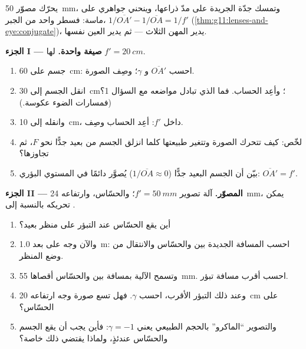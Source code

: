 \begin{problem}
\label{pb:g11:lenses-and-eye:1}
يحرّك مصوّر  \qty{50}{mm}، وتمسك جدّة الجريدة
على مدّ ذراعها، وينحني جواهري على ماسة: فسطر واحد من
الجبر، $1/\overline{OA'} - 1/\overline{OA} = 1/f'$
(\cref{thm:g11:lenses-and-eye:conjugate})، يدير المهن الثلاث ---
ثم يدير العين نفسها.

\medskip
\noindent\textbf{الجزء I --- صيغة واحدة.}  لها
$f' = \qty{20}{cm}$.
\begin{enumerate}
  \item جسم على \qty{60}{cm}: احسب $\overline{OA'}$ و
        $\gamma$؛ وصِف الصورة.
  \item انقل الجسم إلى \qty{30}{cm}؛ وأعِد الحساب. فما الذي تبادل مواضعه
        مع السؤال 1؟ (فمسارات الضوء عكوسة.)
  \item وانقله إلى \qty{10}{cm}، داخل $f'$: أعِد الحساب وصِف.
  \item لخّص: كيف تتحرك الصورة وتتغير طبيعتها كلما انزلق الجسم من
        بعيد جدًّا نحو $F$، ثم تجاوزها؟
  \item بيّن أن الجسم البعيد جدًّا ($1/\overline{OA} \approx 0$)
        يُصوَّر دائمًا في المستوي البؤري: $\overline{OA'} = f'$.
\end{enumerate}

\medskip
\noindent\textbf{الجزء II --- المصوّر.}
 آلة تصوير $f' = \qty{50}{mm}$؛ والحسّاس، وارتفاعه \qty{24}{mm}،
يمكن تحريكه بالنسبة إلى .
\begin{enumerate}[resume]
  \item أين يقع الحسّاس عند التبؤر على منظر بعيد؟
  \item والآن وجه على بعد \qty{1.0}{m}: احسب المسافة الجديدة بين 
        والحسّاس والانتقال من وضع المنظر.
  \item وتسمح الآلية بمسافة بين  والحسّاس أقصاها \qty{55}{mm}.
        احسب أقرب مسافة تبؤر.
  \item وعند ذلك التبؤر الأقرب، احسب $\gamma$. فهل تسع صورة
        وجه ارتفاعه \qty{20}{cm} على الحسّاس؟
  \item والتصوير ``الماكرو'' بالحجم الطبيعي يعني $\gamma = -1$: فأين يجب أن يقع الجسم
        والحسّاس عندئذٍ، ولماذا يقتضي ذلك  خاصة؟
\end{enumerate}


\end{problem}
